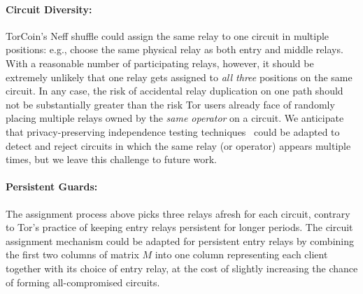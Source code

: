 \paragraph{Circuit Diversity:}  
TorCoin's Neff shuffle could assign the same relay to one circuit in multiple
positions: e.g., choose the same physical relay as both entry and middle
relays. With a reasonable number of participating relays, however,
it should be extremely unlikely that one relay gets assigned
to {\em all three} positions on the same circuit.
In any case, the risk of accidental relay duplication on one path
should not be substantially greater than the risk
Tor users already face of randomly placing multiple relays
owned by the {\em same operator} on a circuit.
We anticipate that privacy-preserving independence testing
techniques~\cite{zhai13untold}
could be adapted to detect and reject circuits in which the same relay
(or operator) appears multiple times,
but we leave this challenge to future work.

\paragraph{Persistent Guards:}
The assignment process above picks three relays
afresh for each circuit,
contrary to Tor's practice of keeping entry relays
persistent for longer periods.
The circuit assignment mechanism could be adapted
for persistent entry relays by combining the first two columns
of matrix $M$ into one column representing each client
together with its choice of entry relay,
at the cost of slightly increasing the chance of forming
all-compromised circuits.


